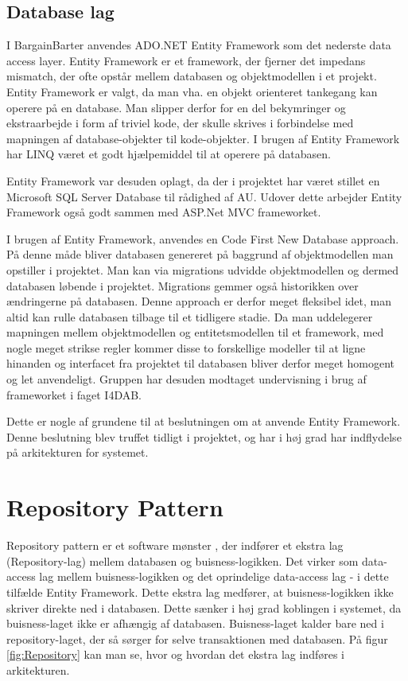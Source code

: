 \subsection{Database lag}
I BargainBarter anvendes ADO.NET Entity Framework\cite{ADOEF} som det nederste data access layer. Entity Framework er et framework, der fjerner det impedans mismatch, der ofte opstår mellem databasen og objektmodellen i et projekt. Entity Framework er valgt, da man vha. en objekt orienteret tankegang kan operere på en database. Man slipper derfor for en del bekymringer og ekstraarbejde i form af triviel kode, der skulle skrives i forbindelse med mapningen af database-objekter til kode-objekter. I brugen af Entity Framework har LINQ \cite{LINQ} været et godt hjælpemiddel til at operere på databasen. 

Entity Framework var desuden oplagt, da der i projektet har været stillet en Microsoft SQL Server Database til rådighed af AU. Udover dette arbejder Entity Framework også godt sammen med ASP.Net MVC frameworket.  

I brugen af Entity Framework, anvendes en Code First New Database\cite{EFCodeFirst} approach. På denne måde bliver databasen genereret på baggrund af objektmodellen man opstiller i projektet. Man kan via migrations udvidde objektmodellen og dermed databasen løbende i projektet. Migrations gemmer også historikken over ændringerne på databasen. Denne approach er derfor meget fleksibel idet, man altid kan rulle databasen tilbage til et tidligere stadie. Da man uddelegerer mapningen mellem objektmodellen og entitetsmodellen til et framework, med nogle meget strikse regler kommer disse to forskellige modeller til at ligne hinanden og interfacet fra projektet til databasen bliver derfor meget homogent og let anvendeligt. Gruppen har desuden modtaget undervisning i brug af frameworket i faget I4DAB.

Dette er nogle af grundene til at beslutningen om at anvende Entity Framework. Denne beslutning blev truffet tidligt i projektet, og har i høj grad har indflydelse på arkitekturen for systemet.

\section{Repository Pattern}
Repository pattern er et software mønster \cite{Mønster}, der indfører et ekstra lag (Repository-lag) mellem databasen og buisness-logikken. Det virker som data-access lag mellem buisness-logikken og det oprindelige data-access lag - i dette tilfælde Entity Framework. Dette ekstra lag medfører, at buisness-logikken ikke skriver direkte ned i databasen. Dette sænker i høj grad koblingen i systemet, da buisness-laget ikke er afhængig af databasen. 
Buisness-laget kalder bare ned i repository-laget, der så sørger for selve transaktionen med databasen. 
På figur \ref{fig:Repository} kan man se, hvor og hvordan det ekstra lag indføres i arkitekturen.

